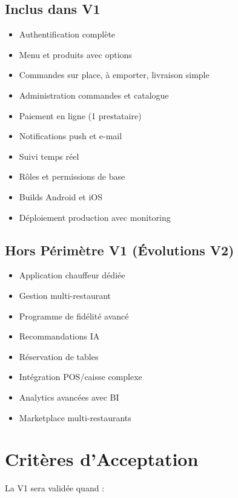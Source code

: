 \documentclass[11pt,a4paper]{article}
\begin{document}
\subsection{Inclus dans V1}

\begin{itemize}
    \item Authentification complète
    \item Menu et produits avec options
    \item Commandes sur place, à emporter, livraison simple
    \item Administration commandes et catalogue
    \item Paiement en ligne (1 prestataire)
    \item Notifications push et e-mail
    \item Suivi temps réel
    \item Rôles et permissions de base
    \item Builds Android et iOS
    \item Déploiement production avec monitoring
\end{itemize}

\subsection{Hors Périmètre V1 (Évolutions V2)}

\begin{itemize}
    \item Application chauffeur dédiée
    \item Gestion multi-restaurant
    \item Programme de fidélité avancé
    \item Recommandations IA
    \item Réservation de tables
    \item Intégration POS/caisse complexe
    \item Analytics avancées avec BI
    \item Marketplace multi-restaurants
\end{itemize}

\section{Critères d'Acceptation}

La V1 sera validée quand :
\end{document}
